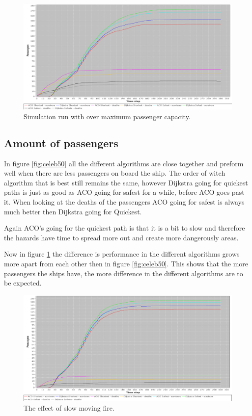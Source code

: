 \begin{figure} [h]
\centering
\hspace*{-1.0in}
\includegraphics[scale=0.35]{images/Graph-using-200-rounds-200-passangers.png}
\caption{Simulation run with over maximum passenger capacity.}
\label{fig:celeb200}
\end{figure}

\subsection{Amount of passengers}

In figure \ref{fig:celeb50} all the different algorithms are close together and preform well when there are less passengers on board the ship. The order of witch algorithm that is best still remains the same, however Dijkstra going for quickest paths is just as good as ACO going for safest for a while, before ACO goes past it. When looking at the deaths of the passengers ACO going for safest is always much better then Dijkstra going for Quickest.

Again ACO's going for the quickest path is that it is a bit to slow and therefore the hazards have time to spread more out and create more dangerously areas.

Now in figure \ref{fig:celeb200} the difference is performance in the different algorithms grows more apart from each other then in figure \ref{fig:celeb50}. This shows that the more passengers the ships have, the more difference in the different algorithms are to be expected.

\begin{figure} [h]
\centering
\hspace*{-1.0in}
\includegraphics[scale=0.35]{images/Graph-using-200-rounds-140-passangers-slow-fire.png}
\caption{The effect of slow moving fire.}
\label{fig:celebSfire}
\end{figure}

